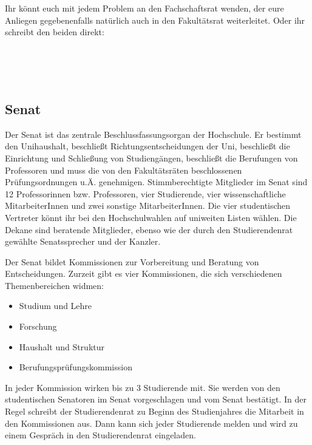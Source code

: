 Ihr könnt euch mit jedem Problem an den Fachschaftsrat wenden, der eure Anliegen gegebenenfalls natürlich auch in den Fakultätsrat weiterleitet.
Oder ihr schreibt den beiden direkt:

\\
\\
\\
    
        
\subsection{Senat}
\label{senat}

Der Senat ist das zentrale Beschlussfassungsorgan der Hochschule.
Er bestimmt den Unihaushalt, beschließt Richtungsentscheidungen der Uni, beschließt die Einrichtung und Schließung von Studiengängen, beschließt die Berufungen von Professoren und muss die von den Fakultätsräten beschlossenen Prüfungsordnungen u.Ä. genehmigen.
Stimmberechtigte Mitglieder im Senat sind 12 Professorinnen bzw. Professoren, vier Studierende, vier wissenschaftliche MitarbeiterInnen und zwei sonstige MitarbeiterInnen.
Die vier studentischen Vertreter könnt ihr bei den Hochschulwahlen auf uniweiten Listen wählen.
Die Dekane sind beratende Mitglieder, ebenso wie der durch den Studierendenrat gewählte Senatssprecher und der Kanzler.

Der Senat bildet Kommissionen zur Vorbereitung und Beratung von Entscheidungen.
Zurzeit gibt es vier Kommissionen, die sich verschiedenen Themenbereichen widmen:

\begin{itemize}
    \item Studium und Lehre
    \item Forschung
    \item Haushalt und Struktur
    \item Berufungsprüfungskommission
\end{itemize}

In jeder Kommission wirken bis zu 3 Studierende mit.
Sie werden von den studentischen Senatoren im Senat vorgeschlagen und vom Senat bestätigt.
In der Regel schreibt der Studierendenrat zu Beginn des Studienjahres die Mitarbeit in den Kommissionen aus.
Dann kann sich jeder Studierende melden und wird zu einem Gespräch in den Studierendenrat eingeladen.


